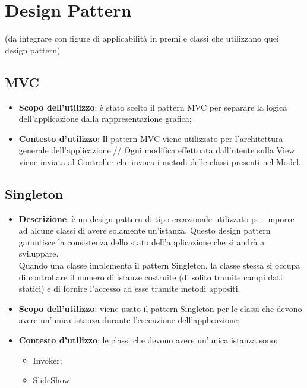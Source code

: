 \section{Design Pattern}{
	(da integrare con figure di applicabilità in premi e classi che utilizzano quei design pattern)
	\begin{figure}
	\end{figure}
	\subsection{MVC}{
			\begin{itemize}
				\item \textbf{Scopo dell’utilizzo}: è stato scelto il pattern MVC per separare la logica dell'applicazione dalla rappresentazione grafica;
				\item \textbf{Contesto d’utilizzo}: Il pattern MVC viene utilizzato per l'architettura generale dell'applicazione.//
				Ogni modifica effettuata dall'utente sulla View viene inviata al Controller che invoca i metodi delle classi presenti nel Model.
			\end{itemize}
		}
		
	\subsection{Singleton}{
		\begin{itemize}
			\item \textbf{Descrizione}: è un design pattern di tipo creazionale utilizzato per imporre ad alcune classi di avere solamente un'istanza. Questo design pattern garantisce la consistenza dello stato dell'applicazione che si andrà a sviluppare.\\
			Quando una classe implementa il pattern Singleton, la classe stessa si occupa di controllare il numero di istanze costruite (di solito tramite campi dati statici) e di fornire l'accesso ad esse tramite metodi appositi.\\
			\item \textbf{Scopo dell’utilizzo}: viene usato il pattern Singleton per le classi che devono avere un'unica istanza durante l'esecuzione dell'applicazione;
			\item \textbf{Contesto d’utilizzo}: le classi che devono avere un’unica istanza sono:
			\begin{itemize}
				\item Invoker;
				\item SlideShow.
			\end{itemize}

\end{itemize}}}
